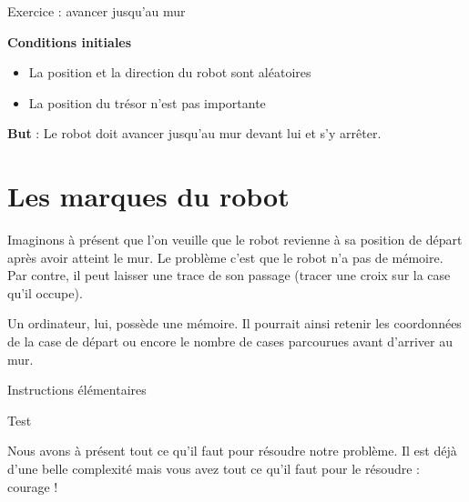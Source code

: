 	\begin{Emphase}{Exercice : avancer jusqu'au mur}

		\textbf{Conditions initiales}

		\begin{itemize}
		\item La position et la direction du robot sont aléatoires
		\item La position du trésor n'est pas importante
		\end{itemize}
		
		\textbf{But} : Le robot doit avancer jusqu'au mur
		devant lui et s'y arrêter.

	\end{Emphase}

\section{Les marques du robot}

	Imaginons à présent que l'on veuille que le robot
	revienne à sa position de départ après avoir atteint le mur. Le
	problème c'est que le robot n'a pas
	de mémoire. Par contre, il peut laisser une trace de son passage
	(tracer une croix sur la case qu'il occupe).
	
	Un ordinateur, lui, possède une mémoire. Il pourrait ainsi retenir les
	coordonnées de la case de départ ou encore le nombre de cases
	parcourues avant d'arriver au mur.

	\begin{Emphase}{Instructions élémentaires}
	\end{Emphase}

	\begin{Emphase}{Test}
	\end{Emphase}

	Nous avons à présent tout ce qu'il faut pour résoudre
	notre problème. Il est déjà d'une belle complexité
	mais vous avez tout ce qu'il faut pour le résoudre :
	courage !


